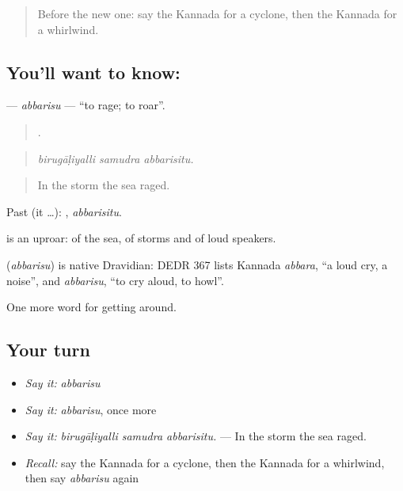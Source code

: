 \label{lesson:KA-C487-abbarisu}



\begin{quote}
Before the new one: say the Kannada for a cyclone, then the Kannada for a whirlwind.
\end{quote}

\subsection*{You'll want to know: }
\textbf{} — \emph{abbarisu} — \textquotedblleft{}to rage; to roar\textquotedblright{}.

\begin{quote}
  .
\end{quote}

\begin{quote}
\emph{birugāḷiyalli samudra abbarisitu.}
\end{quote}

\begin{quote}
In the storm the sea raged.
\end{quote}

Past (it …): , \emph{abbarisitu}.

 is an uproar: of the sea, of storms and of loud speakers.

\begin{cousinweb}
\textbf{} (\emph{abbarisu}) is native Dravidian: DEDR 367 lists Kannada \emph{abbara}, \textquotedblleft{}a loud cry, a noise\textquotedblright{}, and \emph{abbarisu}, \textquotedblleft{}to cry aloud, to howl\textquotedblright{}.
\end{cousinweb}

\begin{grammarlens}[title={What you've built}]
One more word for getting around.
\end{grammarlens}

\subsection*{Your turn}
\begin{itemize}
\raggedright
  \item \emph{Say it:} \emph{abbarisu}
  \item \emph{Say it:} \emph{abbarisu}, once more
  \item \emph{Say it:} \emph{birugāḷiyalli samudra abbarisitu.} — In the storm the sea raged.
  \item \emph{Recall:} say the Kannada for a cyclone, then the Kannada for a whirlwind, then say \emph{abbarisu} again
\end{itemize}

